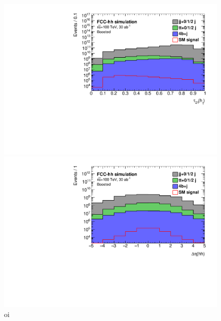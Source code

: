 \begin{figure}
	\centering
	\begin{minipage}{.5\textwidth}
		\centering
		\includegraphics[width=\linewidth]{./images/hist_h1_tau21.pdf}
	\end{minipage}%
	\begin{minipage}{.5\textwidth}
		\centering
		\includegraphics[width=\linewidth]{./images/hist_hh_deltaEta.pdf}
	\end{minipage}
	\caption{oi}
\end{figure}

